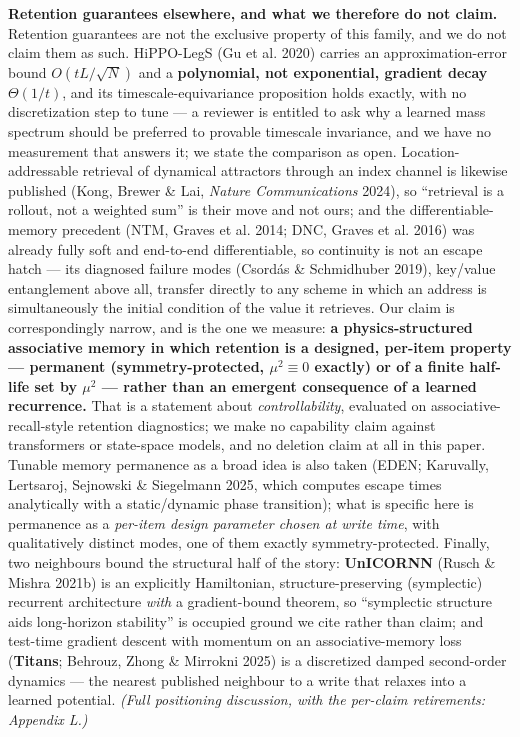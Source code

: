\documentclass[10pt]{article}
\begin{document}
\textbf{Retention guarantees elsewhere, and what we therefore do not claim.} Retention guarantees are not the exclusive property of this family, and we do not claim them as such. HiPPO-LegS (Gu et al. 2020) carries an approximation-error bound $O(tL/\sqrt N)$ and a \textbf{polynomial, not exponential, gradient decay $\Theta(1/t)$}, and its timescale-equivariance proposition holds exactly, with no discretization step to tune --- a reviewer is entitled to ask why a learned mass spectrum should be preferred to provable timescale invariance, and we have no measurement that answers it; we state the comparison as open. Location-addressable retrieval of dynamical attractors through an index channel is likewise published (Kong, Brewer \& Lai, \emph{Nature Communications} 2024), so ``retrieval is a rollout, not a weighted sum'' is their move and not ours; and the differentiable-memory precedent (NTM, Graves et al. 2014; DNC, Graves et al. 2016) was already fully soft and end-to-end differentiable, so continuity is not an escape hatch --- its diagnosed failure modes (Csordás \& Schmidhuber 2019), key/value entanglement above all, transfer directly to any scheme in which an address is simultaneously the initial condition of the value it retrieves. Our claim is correspondingly narrow, and is the one we measure: \textbf{a physics-structured associative memory in which retention is a designed, per-item property --- permanent (symmetry-protected, $\mu^2\equiv0$ exactly) or of a finite half-life set by $\mu^2$ --- rather than an emergent consequence of a learned recurrence.} That is a statement about \emph{controllability}, evaluated on associative-recall-style retention diagnostics; we make no capability claim against transformers or state-space models, and no deletion claim at all in this paper. Tunable memory permanence as a broad idea is also taken (EDEN; Karuvally, Lertsaroj, Sejnowski \& Siegelmann 2025, which computes escape times analytically with a static/dynamic phase transition); what is specific here is permanence as a \emph{per-item design parameter chosen at write time}, with qualitatively distinct modes, one of them exactly symmetry-protected. Finally, two neighbours bound the structural half of the story: \textbf{UnICORNN} (Rusch \& Mishra 2021b) is an explicitly Hamiltonian, structure-preserving (symplectic) recurrent architecture \emph{with} a gradient-bound theorem, so ``symplectic structure aids long-horizon stability'' is occupied ground we cite rather than claim; and test-time gradient descent with momentum on an associative-memory loss (\textbf{Titans}; Behrouz, Zhong \& Mirrokni 2025) is a discretized damped second-order dynamics --- the nearest published neighbour to a write that relaxes into a learned potential. \emph{(Full positioning discussion, with the per-claim retirements: Appendix L.)}
\end{document}
